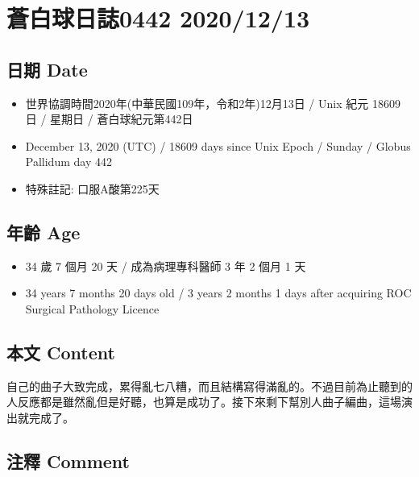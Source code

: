 \documentclass[a5paper, 11pt
]{book}
\providecommand{\tightlist}{%
  \setlength{\itemsep}{0pt}\setlength{\parskip}{0pt}}
\begin{document}
\hypertarget{ux84bcux767dux7403ux65e5ux8a8c0442-20201213}{%
\section{蒼白球日誌0442
2020/12/13}\label{ux84bcux767dux7403ux65e5ux8a8c0442-20201213}}

\hypertarget{ux65e5ux671f-date-12}{%
\subsection{日期 Date}\label{ux65e5ux671f-date-12}}

\begin{itemize}
\tightlist
\item
  世界協調時間2020年(中華民國109年，令和2年)12月13日 / Unix 紀元 18609
  日 / 星期日 / 蒼白球紀元第442日
\item
  December 13, 2020 (UTC) / 18609 days since Unix Epoch / Sunday /
  Globus Pallidum day 442
\item
  特殊註記: 口服A酸第225天
\end{itemize}

\hypertarget{ux5e74ux9f61-age-12}{%
\subsection{年齡 Age}\label{ux5e74ux9f61-age-12}}

\begin{itemize}
\tightlist
\item
  34 歲 7 個月 20 天 / 成為病理專科醫師 3 年 2 個月 1 天
\item
  34 years 7 months 20 days old / 3 years 2 months 1 days after
  acquiring ROC Surgical Pathology Licence
\end{itemize}

\hypertarget{ux672cux6587-content-12}{%
\subsection{本文 Content}\label{ux672cux6587-content-12}}

自己的曲子大致完成，累得亂七八糟，而且結構寫得滿亂的。不過目前為止聽到的人反應都是雖然亂但是好聽，也算是成功了。接下來剩下幫別人曲子編曲，這場演出就完成了。

\hypertarget{ux6ce8ux91cb-comment-12}{%
\subsection{注釋 Comment}\label{ux6ce8ux91cb-comment-12}}
\end{document}
